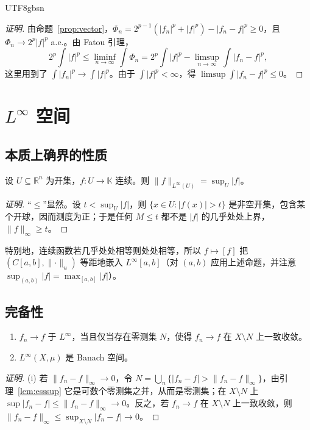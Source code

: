 \documentclass[11pt]{article}
\newcommand{\K}{\mathbb{K}}
\newcommand{\R}{\mathbb{R}}
\newcommand{\norm}[1]{\lVert #1\rVert}
\begin{document}
\begin{CJK*}{UTF8}{gbsn}
\begin{proof}[证明]
由命题~\ref{prop:vector}，$\Phi_{n}=2^{p-1}(|f_{n}|^{p}+|f|^{p})-|f_{n}-f|^{p}\ge0$，且 $\Phi_{n}\to2^{p}|f|^{p}$ a.e.。由 Fatou 引理，
\[
2^{p}\int|f|^{p}\le\liminf_{n\to\infty}\int\Phi_{n}=2^{p}\int|f|^{p}-\limsup_{n\to\infty}\int|f_{n}-f|^{p},
\]
这里用到了 $\int|f_{n}|^{p}\to\int|f|^{p}$。由于 $\int|f|^{p}<\infty$，得 $\limsup\int|f_{n}-f|^{p}\le0$。
\end{proof}

\section{$L^{\infty}$ 空间}

\subsection{本质上确界的性质}

\begin{proposition}\label{prop:cont-esssup}
设 $U\subseteq\R^{n}$ 为开集，$f:U\to\K$ 连续。则 $\norm{f}_{L^{\infty}(U)}=\sup_{U}|f|$。
\end{proposition}

\begin{proof}[证明]
“$\le$”显然。设 $t<\sup_{U}|f|$，则 $\{x\in U:|f(x)|>t\}$ 是非空开集，包含某个开球，因而测度为正；于是任何 $M\le t$ 都不是 $|f|$ 的几乎处处上界，$\norm{f}_{\infty}\ge t$。
\end{proof}

特别地，连续函数若几乎处处相等则处处相等，所以 $f\mapsto[f]$ 把 $(C[a,b],\norm{\cdot}_{u})$ 等距地嵌入 $L^{\infty}[a,b]$（对 $(a,b)$ 应用上述命题，并注意 $\sup_{(a,b)}|f|=\max_{[a,b]}|f|$）。

\subsection{完备性}

\begin{theorem}\label{thm:Linfty-complete}
\begin{enumerate}
\item $f_{n}\to f$ 于 $L^{\infty}$，当且仅当存在零测集 $N$，使得 $f_{n}\to f$ 在 $X\setminus N$ 上一致收敛。
\item $L^{\infty}(X,\mu)$ 是 Banach 空间。
\end{enumerate}
\end{theorem}

\begin{proof}[证明]
(i) 若 $\norm{f_{n}-f}_{\infty}\to0$，令 $N=\bigcup_{n}\{|f_{n}-f|>\norm{f_{n}-f}_{\infty}\}$，由引理~\ref{lem:esssup} 它是可数个零测集之并，从而是零测集；在 $X\setminus N$ 上 $\sup|f_{n}-f|\le\norm{f_{n}-f}_{\infty}\to0$。反之，若 $f_{n}\to f$ 在 $X\setminus N$ 上一致收敛，则 $\norm{f_{n}-f}_{\infty}\le\sup_{X\setminus N}|f_{n}-f|\to0$。


\end{proof}
\end{CJK*}
\end{document}
